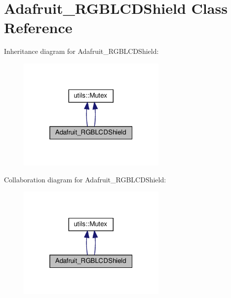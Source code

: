 \hypertarget{classAdafruit__RGBLCDShield}{}\section{Adafruit\+\_\+\+R\+G\+B\+L\+C\+D\+Shield Class Reference}
\label{classAdafruit__RGBLCDShield}


Inheritance diagram for Adafruit\+\_\+\+R\+G\+B\+L\+C\+D\+Shield\+:
\nopagebreak
\begin{figure}[H]
\begin{center}
\leavevmode
\includegraphics[width=205pt]{classAdafruit__RGBLCDShield__inherit__graph}
\end{center}
\end{figure}


Collaboration diagram for Adafruit\+\_\+\+R\+G\+B\+L\+C\+D\+Shield\+:
\nopagebreak
\begin{figure}[H]
\begin{center}
\leavevmode
\includegraphics[width=205pt]{classAdafruit__RGBLCDShield__coll__graph}
\end{center}
\end{figure}
